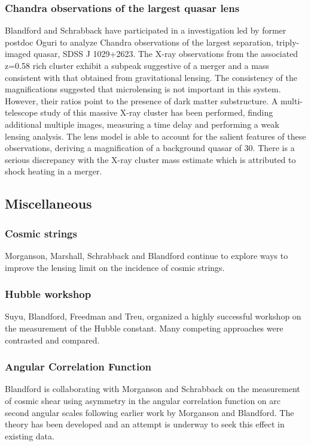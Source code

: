 \documentclass[psfig,11pt]{article}
\begin{document}
\subsubsection{Chandra observations of the largest quasar lens}
Blandford and Schrabback have participated in a investigation led by former postdoc Oguri to analyze Chandra observations of the largest separation, triply-imaged quasar, SDSS J 1029+2623. The X-ray observations from the associated z=0.58 rich cluster exhibit a subpeak suggestive of a merger and a mass consistent with that obtained from gravitational lensing. The consistency of the magnifications suggested that microlensing is not important in this system. However, their ratios point to the presence of dark matter substructure. A multi-telescope study of this massive X-ray cluster has been performed, finding additional multiple images, measuring a time delay and performing a weak lensing analysis. The lens model is able to account for the salient features of these observations, deriving a magnification of a background quasar of 30. There is a serious discrepancy with the X-ray cluster mass estimate which is attributed to shock heating in a merger.
\subsection{Miscellaneous}
\subsubsection{Cosmic strings}
Morganson, Marshall, Schrabback and Blandford continue to explore ways to improve the lensing limit on the incidence of cosmic strings.
\subsubsection{Hubble workshop}
Suyu, Blandford, Freedman and Treu, organized a highly successful workshop on the measurement of the Hubble constant. Many competing approaches were contrasted and compared.
\subsubsection{Angular Correlation Function}
Blandford is collaborating with Morganson and Schrabback on the measurement of cosmic shear using asymmetry in the angular correlation function on arc second angular scales following earlier work by Morganson and Blandford. The theory has been developed and an attempt is underway to seek this effect in existing data.
\end{document}
